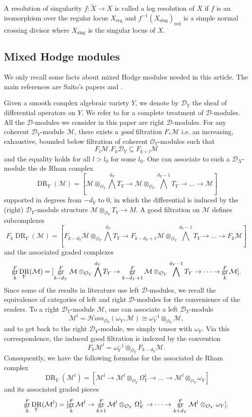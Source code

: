 \documentclass[11pt]{amsart}
\theoremstyle{definition}
\theoremstyle{plain}
\renewcommand{\H}{\mathcal H}
\newcommand{\M}{\mathcal M}
\renewcommand{\O}{\mathcal O}
\newcommand{\sD}{\mathscr D}
\newcommand{\sHom}{\H om} %
\DeclareMathOperator{\DR}{DR}
\DeclareMathOperator{\sing}{sing}
\DeclareMathOperator{\reg}{reg}
\DeclareMathOperator{\gr}{{\rm gr}}
\DeclareMathOperator{\red}{red}
\begin{document}
A resolution of singularity $f: \tilde X \to X$ is called a log resolution of $X$ if $f$ is an isomorphism over the regular locus $X_{\reg}$ and $f^{-1}(X_{\sing})_{\red}$ is a simple normal crossing divisor where $X_{\sing}$ is the singular locus of $X$.

\subsection{Mixed Hodge modules}

We only recall some facts about mixed Hodge modules needed in this article. The main references are Saito's papers \cite{Saito-88} and \cite{saito-MHM}.

Given a smooth complex algebraic variety $Y$, we denote by $\sD_Y$ the sheaf of differential operators on $Y$. We refer to \cite{HTT} for a complete treatment of $\sD$-modules. All the $\sD$-modules we consider in this paper are right $\sD$-modules. For any coherent $\sD_Y$-module $\M$, there exists a \textit{good} filtration $F_*\M$ i.e. an increasing, exhaustive, bounded below filtration of coherent $\O_Y$-modules such that 
\[F_l \M . F_k \sD_Y \subseteq F_{k+l}\M\]
and the equality holds for all $l>l_0$ for some $l_0$. One can associate to such a $\sD_X$-module the de Rham complex
\[\DR_Y(\M) = [\M \otimes_{\O_Y} \bigwedge^{d_Y}T_Y \to \M \otimes_{\O_Y} \bigwedge^{d_Y-1} T_Y \to \dots \to \M]\]
supported in degrees from $-d_Y$ to $0$, in which the differential is induced by the (right) $\sD_Y$-module structure $\M \otimes_{\O_Y} T_Y \to M$. A good filtration on $\M$ defines subcomplexes
\[F_k \DR_Y(\M)= [F_{k-d_Y}\M \otimes_{\O_Y} \bigwedge^{d_Y}T_Y \to F_{k-d_Y+1}\M \otimes_{\O_Y} \bigwedge^{d_Y-1} T_Y \to \dots \to F_k\M]\]
and the associated graded complexes
\[\gr^F_k \DR_Y(\M)= [\gr^F_{k-d_Y}\M \otimes_{\O_Y} \bigwedge^{d_Y}T_Y \to \gr^F_{k-d_Y+1}\M \otimes_{\O_Y} \bigwedge^{d_Y-1} T_Y \to \dots \to \gr^F_k\M].\]
Since some of the results in literature use left $\sD$-modules, we recall the equivalence of categories of left and right $\sD$-modules for the convenience of the readers. To a right $\sD_Y$-module $\M$, one can associate a left $\sD_Y$-module 
\[\M^l = \sHom_{\O_Y}(\omega_Y, \M) \cong \omega_Y^{-1} \otimes_{\O_Y} \M,\] 
and to get back to the right $\sD_Y$-module, we simply tensor with $\omega_Y$. Via this correspondence, the induced good filtration is indexed by the convention
\[F_{k}\M^l = \omega_Y^{-1} \otimes_{\O_Y} F_{k-d_Y}\M.\]
Consequently, we have the following formulas for the associated de Rham complex 
\[\DR_Y(\M^l) = [\M^l \to \M^l \otimes _{\O_Y} \Omega^1_Y \to \dots \to \M^l \otimes_{\O_Y} \omega_Y]\]
and its associated graded pieces
\[\gr^F_k\DR_Y(\M^l) = [\gr^F_{k}\M^l \to \gr^F_{k+1}\M^l \otimes _{\O_Y} \Omega^1_Y \to \dots \to \gr^F_{k+d_Y}\M^l \otimes_{\O_Y} \omega_Y].\]
\end{document}
